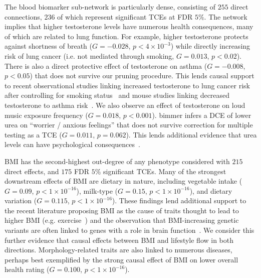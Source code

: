 \documentclass{article}
\begin{document}
The blood biomarker sub-network is particularly dense,
consisting of $255$ direct connections, $236$ of which represent
significant TCEs at FDR $5\%$.
The network implies that higher testosterone levels have numerous health consequences, many of
which are related to lung function. For example, higher testosterone protects against
shortness of breath ($G = -0.028$, $p < 4\times 10^{-3}$)
while directly increasing risk of lung cancer (i.e. not mediated through smoking, $G = 0.013$, $p < 0.02$).
There is also a direct protective effect of testosterone on asthma ($G = -0.008$, $p < 0.05$) that
does not survive our pruning procedure. This lends causal support to
recent observational studies linking increased testosterone to lung cancer risk after controlling
for smoking status~\cite{Hyde2012}
and mouse studies linking decreased testosterone to asthma risk~\cite{Cephus2017}.
We also observe an effect of testosterone on loud
music exposure frequency ($G = 0.018$, $p < 0.001$). bimmer infers a DCE of lower urea
on ``worrier / anxious feelings'' that does not survive correction for multiple testing as
a TCE ($G = 0.011$, $p = 0.062$). This lends additional evidence that urea levels can have psychological
consequences~\cite{Casey1973,Segers1976,Wang2019}.

BMI has the second-highest out-degree of any phenotype considered with
$215$ direct effects, and $175$ FDR $5\%$ significant TCEs.
Many of the strongest downstream effects of BMI are dietary
in nature, including vegetable intake ($G = 0.09$, $p < 1\times 10^{-16}$),
milk-type ($G = 0.15$, $p < 1\times 10^{-16}$), and dietary variation ($G = 0.115$, $p < 1\times 10^{-16}$).
These findings lend additional support to the recent literature proposing BMI as the cause of
traits thought to lead to higher BMI (e.g. exercise~\cite{Richmond2014}) and the observation that
BMI-increasing genetic variants are often linked to genes with a role in brain
function~\cite{Locke2015,Zhu2016,Ndiaye2020}. We consider this further evidence that causal effects between
BMI and lifestyle flow in both directions.
Morphology-related traits are also linked
to numerous diseases, perhaps best exemplified by the strong causal effect of BMI on lower overall
health rating ($G = 0.100$, $p < 1 \times 10^{-16}$).
\end{document}
